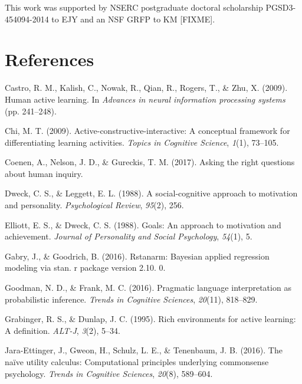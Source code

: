 \documentclass[10pt, letterpaper]{article}
\begin{document}
This work was supported by NSERC postgraduate doctoral scholarship
PGSD3-454094-2014 to EJY and an NSF GRFP to KM {[}FIXME{]}.

\section{References}\label{references}

\setlength{\parindent}{-0.1in} \setlength{\leftskip}{0.125in} \noindent

\hypertarget{refs}{}
\hypertarget{ref-castro2009human}{}
Castro, R. M., Kalish, C., Nowak, R., Qian, R., Rogers, T., \& Zhu, X.
(2009). Human active learning. In \emph{Advances in neural information
processing systems} (pp. 241--248).

\hypertarget{ref-chi2009active}{}
Chi, M. T. (2009). Active-constructive-interactive: A conceptual
framework for differentiating learning activities. \emph{Topics in
Cognitive Science}, \emph{1}(1), 73--105.

\hypertarget{ref-coenen2017}{}
Coenen, A., Nelson, J. D., \& Gureckis, T. M. (2017). Asking the right
questions about human inquiry.

\hypertarget{ref-dweck1988}{}
Dweck, C. S., \& Leggett, E. L. (1988). A social-cognitive approach to
motivation and personality. \emph{Psychological Review}, \emph{95}(2),
256.

\hypertarget{ref-elliott1988}{}
Elliott, E. S., \& Dweck, C. S. (1988). Goals: An approach to motivation
and achievement. \emph{Journal of Personality and Social Psychology},
\emph{54}(1), 5.

\hypertarget{ref-gabry2016rstanarm}{}
Gabry, J., \& Goodrich, B. (2016). Rstanarm: Bayesian applied regression
modeling via stan. r package version 2.10. 0.

\hypertarget{ref-goodman2016}{}
Goodman, N. D., \& Frank, M. C. (2016). Pragmatic language
interpretation as probabilistic inference. \emph{Trends in Cognitive
Sciences}, \emph{20}(11), 818--829.

\hypertarget{ref-grabinger1995rich}{}
Grabinger, R. S., \& Dunlap, J. C. (1995). Rich environments for active
learning: A definition. \emph{ALT-J}, \emph{3}(2), 5--34.

\hypertarget{ref-jara2016}{}
Jara-Ettinger, J., Gweon, H., Schulz, L. E., \& Tenenbaum, J. B. (2016).
The naïve utility calculus: Computational principles underlying
commonsense psychology. \emph{Trends in Cognitive Sciences},
\emph{20}(8), 589--604.
\end{document}
